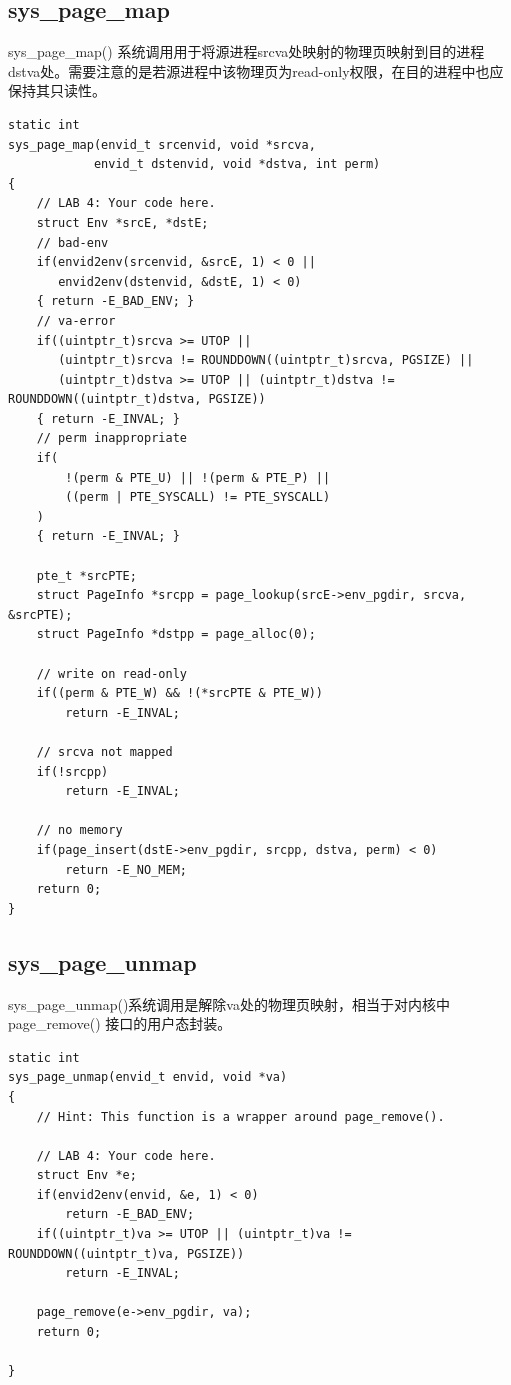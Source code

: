 \documentclass[12pt, letterpaper]{report}
\begin{document}
\newpage
\subsection{\large sys\_page\_map}
sys\_page\_map() 系统调用用于将源进程srcva处映射的物理页映射到目的进程
dstva处。需要注意的是若源进程中该物理页为read-only权限，在目的进程中也应保持其只读性。\par 
\lstset{style=CStyle}
\setmainfont{Consolas}
\begin{lstlisting}
static int
sys_page_map(envid_t srcenvid, void *srcva,
            envid_t dstenvid, void *dstva, int perm)
{
    // LAB 4: Your code here.
    struct Env *srcE, *dstE;
    // bad-env
    if(envid2env(srcenvid, &srcE, 1) < 0 ||
       envid2env(dstenvid, &dstE, 1) < 0)
    { return -E_BAD_ENV; }
    // va-error
    if((uintptr_t)srcva >= UTOP || 
       (uintptr_t)srcva != ROUNDDOWN((uintptr_t)srcva, PGSIZE) ||
       (uintptr_t)dstva >= UTOP || (uintptr_t)dstva != ROUNDDOWN((uintptr_t)dstva, PGSIZE))
    { return -E_INVAL; }
    // perm inappropriate
    if( 
        !(perm & PTE_U) || !(perm & PTE_P) ||
        ((perm | PTE_SYSCALL) != PTE_SYSCALL)
    )
    { return -E_INVAL; }

    pte_t *srcPTE;
    struct PageInfo *srcpp = page_lookup(srcE->env_pgdir, srcva, &srcPTE);
    struct PageInfo *dstpp = page_alloc(0);

    // write on read-only
    if((perm & PTE_W) && !(*srcPTE & PTE_W))
        return -E_INVAL;

    // srcva not mapped
    if(!srcpp)
        return -E_INVAL;

    // no memory
    if(page_insert(dstE->env_pgdir, srcpp, dstva, perm) < 0)
        return -E_NO_MEM;
    return 0;
}
\end{lstlisting}
\setmainfont{Times New Roman}

\newpage
\subsection{\large sys\_page\_unmap}
sys\_page\_unmap()系统调用是解除va处的物理页映射，相当于对内核中
page\_remove() 接口的用户态封装。\par 

\lstset{style=CStyle}
\setmainfont{Consolas}
\begin{lstlisting}
static int
sys_page_unmap(envid_t envid, void *va)
{
    // Hint: This function is a wrapper around page_remove().

    // LAB 4: Your code here.
    struct Env *e;
    if(envid2env(envid, &e, 1) < 0)
        return -E_BAD_ENV;
    if((uintptr_t)va >= UTOP || (uintptr_t)va != ROUNDDOWN((uintptr_t)va, PGSIZE))
        return -E_INVAL;
    
    page_remove(e->env_pgdir, va);
    return 0;

}
\end{lstlisting}
\setmainfont{Times New Roman}
\end{document}
